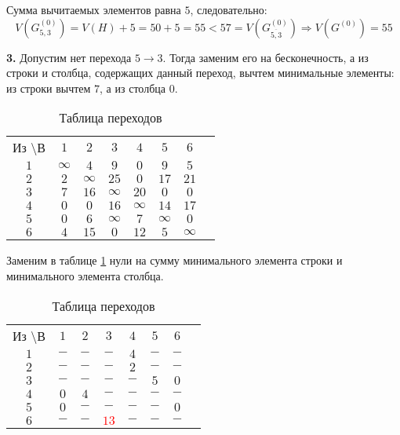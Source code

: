 Сумма вычитаемых элементов равна $5$, следовательно:
\begin{equation*}
V(G_{5,3}^{(0)}) = V(H) + 5 = 50 + 5 = 55 < 57 = V(G_{\overline{5,3}}^{(0)}) \Rightarrow V(G^{(0)}) = 55
\end{equation*}

\textbf{3.} Допустим нет перехода $5 \rightarrow 3$. Тогда заменим его на бесконечность, а из строки и столбца, содержащих данный переход, вычтем минимальные элементы: из строки вычтем $7$, а из столбца $0$.

\begin{table}[H]
\begin{center}
	\def\tabcolsep{15pt}
	\caption{Таблица переходов}
	\label{tab:8}
	\begin{tabular}{|c||c|c|c|c|c|c|c|}
		\hline
		Из \textbackslash В & $1$ & $2$ & $3$ & $4$ & $5$ & $6$ \\
		\hhline{|=#=|=|=|=|=|=|}
		$1$ & $\infty$ & $4$ & $9$ & $0$ & $9$ & $5$ \\
		\hline
		$2$ & $2$ & $\infty$ & $25$ & $0$ & $17$ & $21$ \\
		\hline
		$3$ & $7$ & $16$ & $\infty$ & $20$ & $0$ & $0$ \\ 
		\hline
		$4$ & $0$ & $0$ & $16$ & $\infty$ & $14$ & $17$ \\
		\hline
		$5$ & $0$ & $6$ & $\infty$ & $7$ & $\infty$ & $0$ \\
		\hline
		$6$ & $4$ & $15$ & $0$ & $12$ & $5$ & $\infty$ \\ 
		\hline
	\end{tabular}
\end{center}
\end{table}

Заменим в таблице \ref{tab:8} нули на сумму минимального элемента строки и минимального элемента столбца.

\begin{table}[H]
\begin{center}
	\def\tabcolsep{15pt}
	\caption{Таблица переходов}
	\label{tab:9}
	\begin{tabular}{|c||c|c|c|c|c|c|c|}
		\hline
		Из \textbackslash В & $1$ & $2$ & $3$ & $4$ & $5$ & $6$ \\
		\hhline{|=#=|=|=|=|=|=|}
		$1$ & $-$ & $-$ & $-$ & $4$ & $-$ & $-$ \\
		\hline
		$2$ & $-$ & $-$ & $-$ & $2$ & $-$ & $-$ \\
		\hline
		$3$ & $-$ & $-$ & $-$ & $-$ & $5$ & $0$ \\ 
		\hline
		$4$ & $0$ & $4$ & $-$ & $-$ & $-$ & $-$ \\
		\hline
		$5$ & $0$ & $-$ & $-$ & $-$ & $-$ & $0$ \\
		\hline
		$6$ & $-$ & $-$ & \textcolor{red}{\boldmath$13$} & $-$ & $-$ & $-$ \\ 
		\hline
	\end{tabular}
\end{center}
\end{table}

